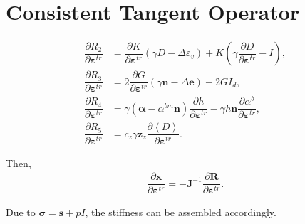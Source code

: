 \documentclass[11pt,a4paper]{article}
\newcommand*{\pfrac}[2]{\dfrac{\partial#1}{\partial#2}}
\begin{document}
\section{Consistent Tangent Operator}
\begin{align}
\pfrac{R_2}{\mathbold{\varepsilon}^{tr}}&=\pfrac{K}{\mathbold{\varepsilon}^{tr}}\left(\gamma{}D-\Delta\varepsilon_v\right)+K\left(\gamma{}\pfrac{D}{\mathbold{\varepsilon}^{tr}}-I\right),\\[2mm]
\pfrac{R_3}{\mathbold{\varepsilon}^{tr}}&=2\pfrac{G}{\mathbold{\varepsilon}^{tr}}\left(\gamma\mathbold{n}-\Delta\mathbold{e}\right)-2GI_d,\\[2mm]
\pfrac{R_4}{\mathbold{\varepsilon}^{tr}}&=\gamma{}\left(\mathbold{\alpha}-\alpha^{bm}\mathbold{n}\right)\pfrac{h}{\mathbold{\varepsilon}^{tr}}-\gamma{}h\mathbold{n}\pfrac{\alpha^b}{\mathbold{\varepsilon}^{tr}},\\[2mm]
\pfrac{R_5}{\mathbold{\varepsilon}^{tr}}&=c_z\gamma{}\mathbold{z}_z\pfrac{\left\langle{}D\right\rangle}{\mathbold{\varepsilon}^{tr}}.
\end{align}

Then,
\begin{gather}
\pfrac{\mathbold{x}}{\mathbold{\varepsilon}^{tr}}=-\mathbold{J}^{-1}\pfrac{\mathbold{R}}{\mathbold{\varepsilon}^{tr}}.
\end{gather}

Due to $\mathbold{\sigma}=\mathbold{s}+pI$, the stiffness can be assembled accordingly.
\end{document}
